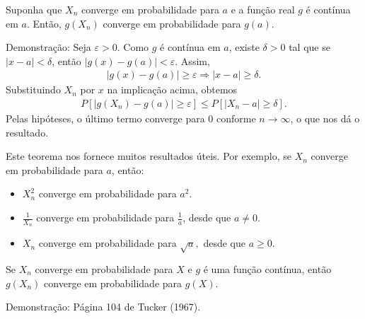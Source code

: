 \documentclass[12pt]{beamer}
\begin{document}
\begin{frame}{}
\begin{Teorema}
\justifying
Suponha que $X_{n}$ converge em probabilidade para $a$ e a função real $g$ é contínua em $a$. Então, $g(X_{n})$ converge em probabilidade para $g(a)$.
\end{Teorema}
\begin{block}{Demonstração:}
\justifying
Seja $\varepsilon > 0$. Como $g$ é contínua em $a$, existe $\delta > 0$ tal que se $|x - a| < \delta$, então $|g(x) - g(a)| < \varepsilon$. Assim,
\begin{align*}
|g(x) - g(a)| \geq \varepsilon \Rightarrow |x - a| \geq \delta.
\end{align*}
Substituindo $X_{n}$ por $x$ na implicação acima, obtemos
\begin{align*}
P[|g(X_{n}) - g(a)| \geq \varepsilon] \leq P[|X_{n} - a| \geq \delta].
\end{align*}
Pelas hipóteses, o último termo converge para $0$ conforme $n \to \infty$, o que nos dá o resultado.
\end{block}
\end{frame}

\begin{frame}{}
\begin{block}{}
\justifying
Este teorema nos fornece muitos resultados úteis. Por exemplo, se $X_{n}$ converge em probabilidade para $a$, então:
\begin{itemize}
\item $X^{2}_{n}$ converge em probabilidade para $a^{2}.$
\item $\frac{1}{X_{n}}$ converge em probabilidade para $\frac{1}{a}$, desde que  $a \neq 0.$
\item $X_{n}$ converge em probabilidade para $\sqrt{a},$ desde que $a \geq 0.$
\end{itemize}
\end{block}
\end{frame}

\begin{frame}{}
\begin{Teorema}
\justifying
Se $X_{n}$ converge em probabilidade para $X$ e $g$ é uma função contínua, então $g(X_{n})$ converge em probabilidade para $g(X).$
\end{Teorema}
\begin{block}{Demonstração:}
\justifying
Página 104 de Tucker (1967).
\end{block}
\end{frame}
\end{document}
